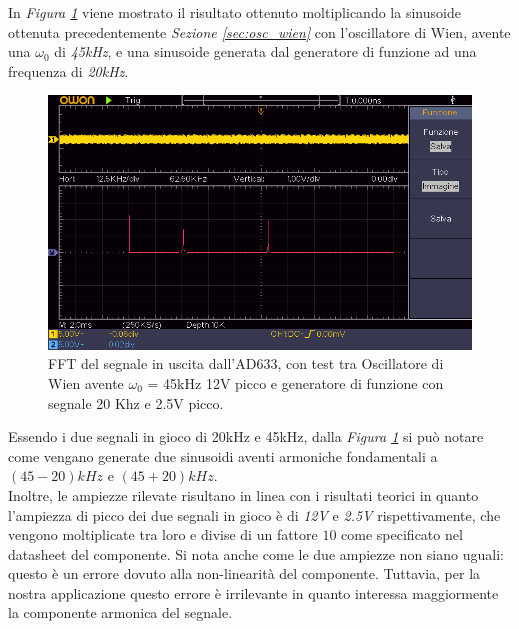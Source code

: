 \documentclass[titlepage]{report}
\begin{document}
	\noindent In \textit{Figura \ref{fig:FFTmixer}} viene mostrato il risultato ottenuto moltiplicando la sinusoide ottenuta precedentemente \textit{Sezione \ref{sec:osc_wien}} con l'oscillatore di Wien, avente una $\omega_0$ di \textit{45kHz}, e una sinusoide generata dal generatore di funzione ad una frequenza di \textit{20kHz}.

	\begin{figure}[H]
		\centering
		\includegraphics[scale=0.9]{Immagini/uscita_ad633_con_fcngen_20k_e_osc_45k.png}
		\caption{FFT del segnale in uscita dall'AD633, con test tra Oscillatore di Wien avente $\omega_0$ = 45kHz 12V picco e generatore di funzione con segnale 20 Khz e 2.5V picco.}
		\label{fig:FFTmixer}
	\end{figure}
	
	 \noindent Essendo i due segnali in gioco di 20kHz e 45kHz, dalla  \textit{Figura \ref{fig:FFTmixer}} si può notare come vengano generate due sinusoidi aventi armoniche fondamentali a $(45-20)kHz$ e $(45+20)kHz$. %
	 \\
	 Inoltre, le ampiezze rilevate risultano in linea con i risultati teorici in quanto l'ampiezza di picco dei due segnali in gioco è di \textit{12V} e \textit{2.5V} rispettivamente, che vengono moltiplicate tra loro e divise di un fattore $10$ come specificato nel datasheet del componente. Si nota anche come le due ampiezze non siano uguali: questo è un errore dovuto alla non-linearità del componente. Tuttavia, per la nostra applicazione questo errore è irrilevante in quanto interessa maggiormente la componente armonica del segnale.
	
\end{document}
